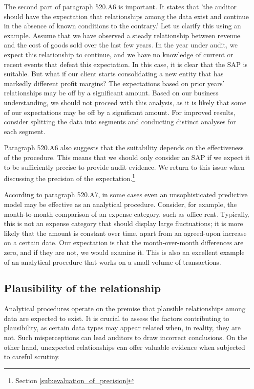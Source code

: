 The second part of paragraph 520.A6 is important. It states that 'the auditor should have the expectation that relationships among the data exist and continue in the absence of known conditions to the contrary.' Let us clarify this using an example. Assume that we have observed a steady relationship between revenue and the cost of goods sold over the last few years. In the year under audit, we expect this relationship to continue, and we have no knowledge of current or recent events that defeat this expectation. In this case, it is clear that the SAP is suitable. But what if our client starts consolidating a new entity that has markedly different profit margins? The expectations based on prior years’ relationships may be off by a significant amount. Based on our business understanding, we should not proceed with this analysis, as it is likely that some of our expectations may be off by a significant amount. For improved results, consider splitting the data into segments and conducting distinct analyses for each segment.

Paragraph 520.A6 also suggests that the suitability depends on the effectiveness of the procedure. This means that we should only consider an SAP if we expect it to be sufficiently precise to provide audit evidence. We return to this issue when discussing the precision of the expectation.\footnote{Section \ref{sub:evaluation_of_precision}}

According to paragraph 520.A7, in some cases even an unsophisticated predictive model may be effective as an analytical procedure. Consider, for example, the month-to-month comparison of an expense category, such as office rent. Typically, this is not an expense category that should display large fluctuations; it is more likely that the amount is constant over time, apart from an agreed-upon increase on a certain date. Our expectation is that the month-over-month differences are zero, and if they are not, we would examine it. This is also an excellent example of an analytical procedure that works on a small volume of transactions.


\subsection{Plausibility of the relationship} %
\label{sub:plausibility_of_the_relationship}

Analytical procedures operate on the premise that plausible relationships among data are expected to exist. It is crucial to assess the factors contributing to plausibility, as certain data types may appear related when, in reality, they are not. Such misperceptions can lead auditors to draw incorrect conclusions. On the other hand, unexpected relationships can offer valuable evidence when subjected to careful scrutiny.

